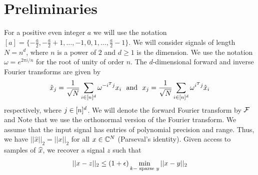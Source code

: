 \section{Preliminaries}\label{sec:prelim}

For a positive even integer $a$ we will use the notation $[a]=\{-\frac{a}{2}, -\frac{a}{2}+1, \ldots, -1, 0, 1,\ldots, \frac{a}{2}-1\}$. We will consider signals of length $N=n^d$, where $n$ is a power of $2$ and $d\geq 1$ is the dimension.  We use the notation $\omega=e^{2\pi i/n}$ for the root of unity of order $n$. The $d$-dimensional forward and inverse Fourier transforms are given by
\begin{equation}\label{eq:dft-forward}
\hat x_{j}=\frac1{\sqrt{N}}\sum_{i\in {[n]^d}}  \omega^{-i^Tj}x_i \text{~~and~~}x_{j}=\frac1{\sqrt{N}}\sum_{i\in {[n]^d}}  \omega^{i^Tj}\hat x_i
\end{equation}
respectively, where $j\in {[n]^d}$. We will denote the forward Fourier transform by $\mathcal{F}$ and 
Note that we use the orthonormal version of the Fourier transform. We assume that the input signal has entries of polynomial precision and range. Thus, we have $||\hat x||_2=||x||_2$ for all $x\in \mathbb{C}^N$ (Parseval's identity).
Given access to samples of $\widehat{x}$, we recover a signal $z$ such that 
\begin{equation*}
||x-z||_2\leq (1+{\epsilon})\min_{k-\text{~sparse~} y} ||x-y||_2
\end{equation*}



